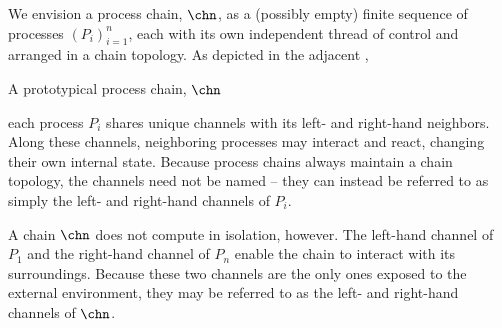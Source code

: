 We envision a process chain, $\chn$, as a (possibly empty) finite sequence of processes $(P_i)_{i=1}^{n}$, each with its own independent thread of control and arranged in a chain topology.
As depicted in the adjacent ,%
%
\begin{marginfigure}
  \caption{A prototypical process chain, $\chn$}\label{fig:singleton-processes:chain-topology}
\end{marginfigure}
%
each process $P_i$ shares unique channels with its left- and right-hand neighbors.
Along these channels, neighboring processes may interact and react, changing their own internal state.
Because process chains always maintain a chain topology, the channels need not be named -- they can instead be referred to as simply the left- and right-hand channels of $P_i$.

A chain $\chn$ does not compute in isolation, however.
The left-hand channel of $P_1$ and the right-hand channel of $P_n$ enable the chain to interact with its surroundings.
Because these two channels are the only ones exposed to the external environment, they may be referred to as the left- and right-hand channels of $\chn$.

